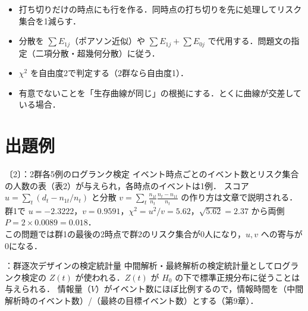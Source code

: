 \begin{warnbox}
\begin{itemize}
\item 打ち切りだけの時点にも行を作る．同時点の打ち切りを先に処理してリスク集合を1減らす．
\item 分散を $\sum E_{1j}$（ポアソン近似）や $\sum E_{1j}+\sum E_{0j}$ で代用する．問題文の指定（二項分散・超幾何分散）に従う．
\item $\chi^2$ を自由度2で判定する（2群なら自由度1）．
\item 有意でないことを「生存曲線が同じ」の根拠にする．とくに曲線が交差している場合．
\end{itemize}
\end{warnbox}

\section{出題例}\label{sec:m02-shutsudai}
\begin{shutsudai}{〔2〕：2群各5例のログランク検定}
イベント時点ごとのイベント数とリスク集合の人数の表（表2）が与えられ，各時点のイベントは1例．
スコア $u=\sum_t(d_t-n_{1t}/n_t)$ と分散 $v=\sum_t\frac{n_{1t}}{n_t}\frac{n_t-n_{1t}}{n_t}$ の作り方は文章で説明される．
群1で $u=-2.3222$，$v=0.9591$，$\chi^2=u^2/v=5.62$，$\sqrt{5.62}=2.37$ から両側 $P=2\times0.0089=0.018$．\\
この問題では群1の最後の2時点で群2のリスク集合が0人になり，$u,v$ への寄与が0になる．
\end{shutsudai}
\begin{shutsudai}{：群逐次デザインの検定統計量}
中間解析・最終解析の検定統計量としてログランク検定の $Z(t)$ が使われる．$Z(t)$ が $H_0$ の下で標準正規分布に従うことは与えられる．
情報量（$V$）がイベント数にほぼ比例するので，情報時間を（中間解析時のイベント数）/（最終の目標イベント数）とする（第9章）．
\end{shutsudai}

